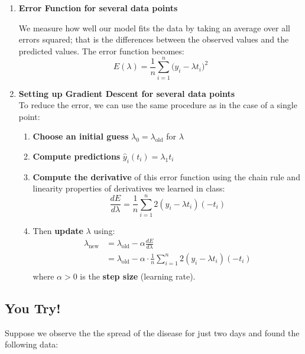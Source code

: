 \documentclass[11pt]{article}
\begin{document}
\begin{enumerate}
\item \textbf{Error Function for several data points}

We measure how well our model fits the data by taking an average over all errors squared; that is the differences between the observed values and the predicted values. The error function becomes:
\[
E(\lambda) = \frac{1}{n} \sum_{i=1}^{n} \big(y_i - \lambda t_i \big)^2
\]
\item \textbf{Setting up Gradient Descent for several data points} \\
To reduce the error, we can use the same procedure as in the case of a single point:
    \begin{enumerate}
    \item[(a)] \textbf{Choose an initial guess} $\lambda_0 = \lambda_{\text{old}}$ for $\lambda$
    \item[(b)] \textbf{Compute predictions} $\hat{y}_i(t_i) = \lambda_1 t_i$\\

    \item[(c)] \textbf{Compute the derivative} of this error function using the chain rule and linearity properties of derivatives we learned in class:
    \[\frac{dE}{d\lambda} = \frac{1}{n} \sum_{i=1}^{n} 2(y_i - \lambda t_i)(-t_i)\]
    \item[(d)] Then \textbf{update} $\lambda$ using:
    \begin{align*}
    \lambda_{\text{new}} &= \lambda_{\text{old}} - \alpha \frac{dE}{d\lambda} \\
    &= \lambda_{\text{old}} - \alpha \cdot\frac{1}{n} \sum_{i=1}^{n} 2(y_i - \lambda t_i)(-t_i)\\
    \end{align*}
    where $\alpha > 0$ is the \textbf{step size} (learning rate).
    \end{enumerate}
\end{enumerate}
\subsection*{You Try!}

Suppose we observe the the spread of the disease for just two days and found the following data:
\end{document}
